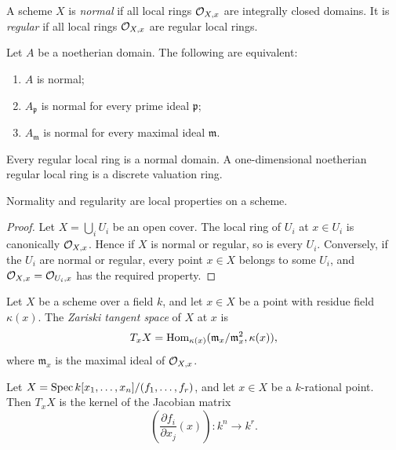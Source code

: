 \begin{definition}
A scheme \(X\) is \emph{normal} if all local rings \(\mathcal{O}_{X,x}\) are integrally
closed domains.  It is \emph{regular} if all local rings \(\mathcal{O}_{X,x}\) are
regular local rings.
\end{definition}

\begin{fact}
Let \(A\) be a noetherian domain.  The following are equivalent:
\begin{enumerate}[label=(\roman*)]
    \item \(A\) is normal;
    \item \(A_{\mathfrak p}\) is normal for every prime ideal \(\mathfrak p\);
    \item \(A_{\mathfrak m}\) is normal for every maximal ideal \(\mathfrak m\).
\end{enumerate}
Every regular local ring is a normal domain.  A one-dimensional noetherian
regular local ring is a discrete valuation ring.
\end{fact}

\begin{proposition}
Normality and regularity are local properties on a scheme.
\end{proposition}

\begin{proof}
Let \(X=\bigcup_i U_i\) be an open cover.  The local ring of \(U_i\) at
\(x\in U_i\) is canonically \(\mathcal{O}_{X,x}\).  Hence if \(X\) is normal or regular,
so is every \(U_i\).  Conversely, if the \(U_i\) are normal or regular, every
point \(x\in X\) belongs to some \(U_i\), and \(\mathcal{O}_{X,x}=\mathcal{O}_{U_i,x}\) has the
required property.
\end{proof}

\begin{definition}
Let \(X\) be a scheme over a field \(k\), and let \(x\in X\) be a point with
residue field \(\kappa(x)\).  The \emph{Zariski tangent space} of \(X\) at
\(x\) is
\[
    T_xX=\operatorname{Hom}_{\kappa(x)}(\mathfrak m_x/\mathfrak m_x^2,\kappa(x)),
\]
where \(\mathfrak m_x\) is the maximal ideal of \(\mathcal{O}_{X,x}\).
\end{definition}

\begin{proposition}
Let \(X=\operatorname{Spec} k[x_1,\ldots,x_n]/(f_1,\ldots,f_r)\), and let \(x\in X\) be a
\(k\)-rational point.  Then \(T_xX\) is the kernel of the Jacobian matrix
\[
    \left(\frac{\partial f_i}{\partial x_j}(x)\right):
    k^n\longrightarrow k^r.
\]
\end{proposition}

